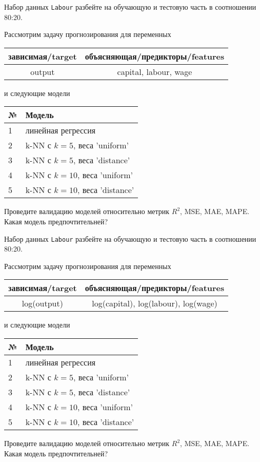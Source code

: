\begin{exercise}
Набор данных \texttt{Labour} разбейте на обучающую и тестовую часть
в соотношении 80:20.

Рассмотрим задачу прогнозирования для переменных
\begin{center}
	\begin{tabular}{|c|c|}\hline
		зависимая/target & объясняющая/предикторы/features \\ \hline
		output & capital, labour, wage \\ \hline
	\end{tabular}
\end{center}
и следующие модели
\begin{center}
	\begin{tabular}{|l|l|}\hline
		№ & Модель \\ \hline
		1 & линейная регрессия\\
		2 & k-NN с \(k=5\), веса 'uniform' \\
		3 & k-NN с \(k=5\), веса 'distance' \\
		4 & k-NN с \(k=10\), веса 'uniform' \\
		5 & k-NN с \(k=10\), веса 'distance' \\ \hline
	\end{tabular}
\end{center}
Проведите валидацию моделей относительно метрик \(R^2\), MSE, MAE,
MAPE. Какая модель предпочтительней?
\end{exercise}

\begin{exercise}
Набор данных \texttt{Labour} разбейте на обучающую и тестовую часть
в соотношении 80:20.

Рассмотрим задачу прогнозирования для переменных
\begin{center}
	\begin{tabular}{|c|c|}\hline
		зависимая/target & объясняющая/предикторы/features \\ \hline
		log(output) & log(capital), log(labour), log(wage) \\ \hline
	\end{tabular}
\end{center}
и следующие модели
\begin{center}
	\begin{tabular}{|l|l|}\hline
		№ & Модель \\ \hline
		1 & линейная регрессия\\
		2 & k-NN с \(k=5\), веса 'uniform' \\
		3 & k-NN с \(k=5\), веса 'distance' \\
		4 & k-NN с \(k=10\), веса 'uniform' \\
		5 & k-NN с \(k=10\), веса 'distance' \\ \hline
	\end{tabular}
\end{center}
Проведите валидацию моделей относительно метрик \(R^2\), MSE, MAE,
MAPE. Какая модель предпочтительней?
\end{exercise}